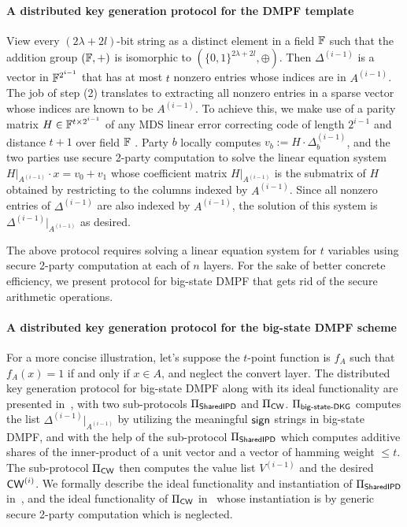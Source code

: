\paragraph{A distributed key generation protocol for the DMPF template}View every $(2\lambda+2l)$-bit string as a distinct element in a field $\mathbb{F}$ such that the addition group $(\mathbb{F},+)$ is isomorphic to $(\{0,1\}^{2\lambda+2l},\oplus)$. Then $\Delta^{(i-1)}$ is a vector in $\mathbb{F}^{2^{i-1}}$ that has at most $t$ nonzero entries whose indices are in $A^{(i-1)}$. The job of step (2) translates to extracting all nonzero entries in a sparse vector whose indices are known to be $A^{(i-1)}$. To achieve this, we make use of a parity matrix $H\in\mathbb{F}^{t\times 2^{i-1}}$ of any MDS linear error correcting code of length $2^{i-1}$ and distance $t+1$ over field $\mathbb{F}$ \cite{MR2253870}. Party $b$ locally computes $v_b:=H\cdot \Delta_b^{(i-1)}$, and the two parties use secure 2-party computation to solve the linear equation system $H|_{A^{(i-1)}}\cdot x = v_0+v_1$ whose coefficient matrix $H|_{A^{(i-1)}}$ is the submatrix of $H$ obtained by restricting to the columns indexed by $A^{(i-1)}$. Since all nonzero entries of $\Delta^{(i-1)}$ are also indexed by $A^{(i-1)}$, the solution of this system is $\Delta^{(i-1)}|_{A^{(i-1)}}$ as desired. 

The above protocol requires solving a linear equation system for $t$ variables using secure 2-party computation at each of $n$ layers. For the sake of better concrete efficiency, we present protocol for big-state DMPF that gets rid of the secure arithmetic operations. 

\paragraph{A distributed key generation protocol for the big-state DMPF scheme}For a more concise illustration, let's suppose the $t$-point function is $f_A$ such that $f_A(x) = 1$ if and only if $x\in A$, and neglect the convert layer. The distributed key generation protocol for big-state DMPF along with its ideal functionality are presented in~, with two sub-protocols $\Pi_{\sf SharedIPD}$ and $\Pi_{\sf CW}$. $\Pi_{\sf big\text{-} state\text{-} DKG}$ computes the list $\Delta^{(i-1)}|_{A^{(i-1)}}$ by utilizing the meaningful ${\sf sign}$ strings in big-state DMPF, and with the help of the sub-protocol $\Pi_{\sf SharedIPD}$ which computes additive shares of the inner-product of a unit vector and a vector of hamming weight $\le t$. The sub-protocol $\Pi_{\sf CW}$ then computes the value list $V^{(i-1)}$ and the desired ${\sf CW}^{(i)}$. 
We formally describe the ideal functionality and instantiation of $\Pi_{\sf SharedIPD}$ in~, and the ideal functionality of $\Pi_{\sf CW}$ in~ whose instantiation is by generic secure 2-party computation which is neglected. 


